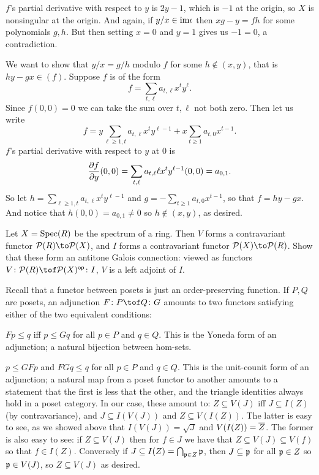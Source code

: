        \item $f$'s partial derivative with respect to $y$ is $2y-1$, which is $-1$ at the origin, so $X$ is nonsingular at the origin.
        And again, if $y/x\in{\rm im}\iota$ then $xg-y=fh$ for some polynomials $g,h$.
        But then setting $x=0$ and $y=1$ gives us $-1=0$, a contradiction.
    \eenum

    \item We want to show that $y/x=g/h$ modulo $f$ for some $h\notin(x,y)$, that is $hy-gx\in(f)$.
    Suppose $f$ is of the form
    $$ f = \sum_{t,\ell}a_{t,\ell}x^ty^\ell . $$
    Since $f(0,0)=0$ we can take the sum over $t,\ell$ not both zero.
    Then let us write
    $$ f = y\sum_{\ell\geq1,t}a_{t,\ell}x^ty^{\ell-1} + x\sum_{t\geq1}a_{t,0}x^{t-1} . $$ 
    $f$'s partial derivative with respect to $y$ at $0$ is
    $$ {{\partial f}\over{\partial y}}(0,0) = \sum_{t,\ell}a_{t,\ell}\ell x^ty^{\ell-1}(0,0) = a_{0,1} . $$
    So let $h=\sum_{\ell\geq1,t}a_{t,\ell}x^ty^{\ell-1}$ and $g=-\sum_{t\geq1}a_{t,0}x^{t-1}$, so that $f=hy-gx$.
    And notice that $h(0,0)=a_{0,1}\neq0$ so $h\notin(x,y)$, as desired.
\eenum

\bprob

    Let $X={\rm Spec}(R)$ be the spectrum of a ring.
    Then $V$ forms a contravariant functor $\pow(R)\to\pow(X)$, and $I$ forms a contravariant functor $\pow(X)\to\pow(R)$.
    Show that these form an antitone Galois connection: viewed as functors $V\colon\pow(R)\tof\pow(X)^\op\colon I$, $V$ is a left adjoint of $I$.

\eprob

Recall that a functor between posets is just an order-preserving function.
If $P,Q$ are posets, an adjunction $F\colon P\tof Q\colon G$ amounts to two functors satisfying either of the two equivalent conditions:
\benum
    \item $Fp\leq q$ iff $p\leq Gq$ for all $p\in P$ and $q\in Q$.
    This is the Yoneda form of an adjunction; a natural bijection between hom-sets.
    \item $p\leq GFp$ and $FGq\leq q$ for all $p\in P$ and $q\in Q$.
    This is the unit-counit form of an adjunction; a natural map from a poset functor to another amounts to a statement that the first is
    less that the other, and the triangle identities always hold in a poset category.
\eenum
In our case, these amount to: $Z\subseteq V(J)$ iff $J\subseteq I(Z)$ (by contravariance), and $J\subseteq I(V(J))$ and $Z\subseteq V(I(Z))$.
The latter is easy to see, as we showed above that $I(V(J))=\sqrt J$ and $V(I(Z))={\overline{Z}}$.
The former is also easy to see: if $Z\subseteq V(J)$ then for $f\in J$ we have that $Z\subseteq V(J)\subseteq V(f)$ so that $f\in I(Z)$.
Conversely if $J\subseteq I(Z)=\bigcap_{{{\frak p}}\in Z}{{\frak p}}$, then $J\subseteq{{\frak p}}$ for all ${{\frak p}}\in Z$ so ${{\frak p}}\in V(J)$, so $Z\subseteq V(J)$ as desired.

